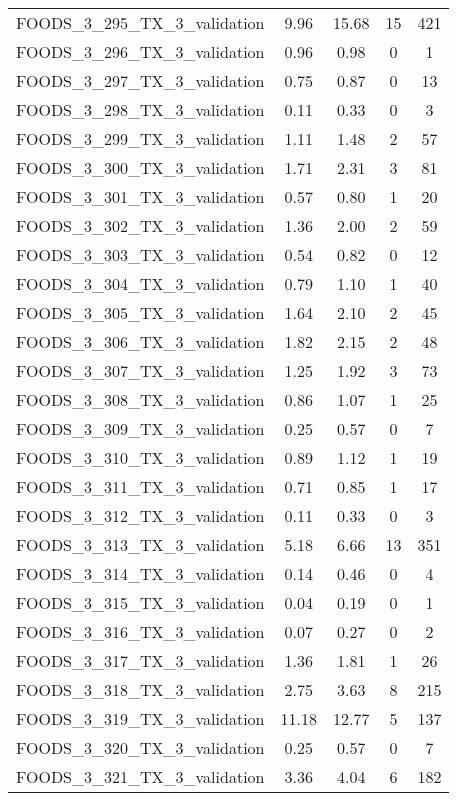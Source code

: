 \begin{table}
\begin{tabular}{|l|c|c|c|c|}
FOODS\_3\_295\_TX\_3\_validation & 9.96 & 15.68 & 15 & 421 \\
FOODS\_3\_296\_TX\_3\_validation & 0.96 & 0.98 & 0 & 1 \\
FOODS\_3\_297\_TX\_3\_validation & 0.75 & 0.87 & 0 & 13 \\
FOODS\_3\_298\_TX\_3\_validation & 0.11 & 0.33 & 0 & 3 \\
FOODS\_3\_299\_TX\_3\_validation & 1.11 & 1.48 & 2 & 57 \\
FOODS\_3\_300\_TX\_3\_validation & 1.71 & 2.31 & 3 & 81 \\
FOODS\_3\_301\_TX\_3\_validation & 0.57 & 0.80 & 1 & 20 \\
FOODS\_3\_302\_TX\_3\_validation & 1.36 & 2.00 & 2 & 59 \\
FOODS\_3\_303\_TX\_3\_validation & 0.54 & 0.82 & 0 & 12 \\
FOODS\_3\_304\_TX\_3\_validation & 0.79 & 1.10 & 1 & 40 \\
FOODS\_3\_305\_TX\_3\_validation & 1.64 & 2.10 & 2 & 45 \\
FOODS\_3\_306\_TX\_3\_validation & 1.82 & 2.15 & 2 & 48 \\
FOODS\_3\_307\_TX\_3\_validation & 1.25 & 1.92 & 3 & 73 \\
FOODS\_3\_308\_TX\_3\_validation & 0.86 & 1.07 & 1 & 25 \\
FOODS\_3\_309\_TX\_3\_validation & 0.25 & 0.57 & 0 & 7 \\
FOODS\_3\_310\_TX\_3\_validation & 0.89 & 1.12 & 1 & 19 \\
FOODS\_3\_311\_TX\_3\_validation & 0.71 & 0.85 & 1 & 17 \\
FOODS\_3\_312\_TX\_3\_validation & 0.11 & 0.33 & 0 & 3 \\
FOODS\_3\_313\_TX\_3\_validation & 5.18 & 6.66 & 13 & 351 \\
FOODS\_3\_314\_TX\_3\_validation & 0.14 & 0.46 & 0 & 4 \\
FOODS\_3\_315\_TX\_3\_validation & 0.04 & 0.19 & 0 & 1 \\
FOODS\_3\_316\_TX\_3\_validation & 0.07 & 0.27 & 0 & 2 \\
FOODS\_3\_317\_TX\_3\_validation & 1.36 & 1.81 & 1 & 26 \\
FOODS\_3\_318\_TX\_3\_validation & 2.75 & 3.63 & 8 & 215 \\
FOODS\_3\_319\_TX\_3\_validation & 11.18 & 12.77 & 5 & 137 \\
FOODS\_3\_320\_TX\_3\_validation & 0.25 & 0.57 & 0 & 7 \\
FOODS\_3\_321\_TX\_3\_validation & 3.36 & 4.04 & 6 & 182 \\

\end{tabular}
\end{table}

